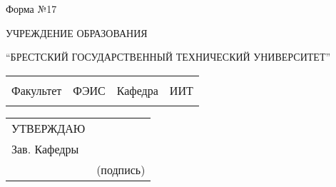\documentclass[12pt, А4]{article} %
\begin{document}


    \begin{FlushRight} %
    \fontsize{11}{13.75} \textsf{Форма №17} 
    \end{FlushRight} %


\fontsize{14}{17.5} %


    \begin{Center} %

    \textrm{ УЧРЕЖДЕНИЕ ОБРАЗОВАНИЯ}
    \par %
    \textrm{“БРЕСТСКИЙ ГОСУДАРСТВЕННЫЙ ТЕХНИЧЕСКИЙ УНИВЕРСИТЕТ”}

    \end{Center}  %


\fontsize{12}{15} %


    \begin{FlushLeft} %

    \begin{tabular}{p{2.2cm} p{5.8cm} p{2.2cm} p{5.75cm}} %
        & & %
        \\ %
        \textsf{Факультет} & 
        \centering \textsf{ФЭИС} \vspace{1pt} \hline &
        \textsf{Кафедра} &
        \centering \textsf{ИИТ} \vspace{1pt} \hline 
        \\ %
        & & %
    \end{tabular} %

    \begin{tabular}{p{2.8cm} p{5.25cm}} %
        \textsf{УТВЕРЖДАЮ} & 
        \\ %
        \textsf{Зав. Кафедры} &
        \vspace{1pt} \hline 
        \\ %
        \hspace{2.8cm} &  \centering \textsf{(подпись)}
    \end{tabular} %

    \end{FlushLeft} %
\end{document}
